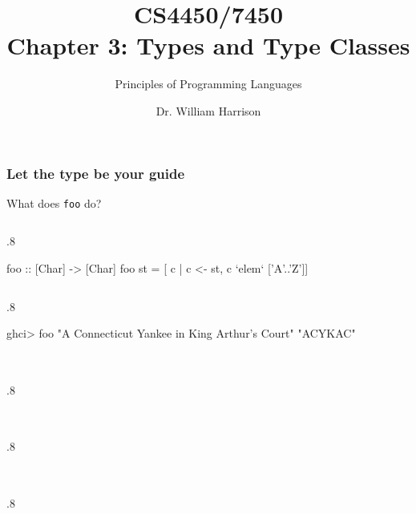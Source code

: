 \documentclass{beamer}
\title[CS4450]{CS4450/7450\\Chapter 3: Types and Type Classes}
\subtitle{Principles of Programming Languages}
\author[Bill Harrison]{Dr. William Harrison}
\institute{University of Missouri}
\newenvironment{codeblock}[1][.8]{%
\begin{columns}
\begin{column}{#1\linewidth}
\begin{exampleblock}{}}{%
\end{exampleblock}
\end{column}
\end{columns}}
\begin{document}
\frame{\titlepage}

\begin{frame}[fragile]
\frametitle{Let the type be your guide}

What does \verb+foo+ do?
\begin{codeblock}
\begin{hcode}
foo :: [Char] -> [Char]  
foo st = [ c | c <- st, c `elem` ['A'..'Z']] 
\end{hcode}
\end{codeblock}

\pause
\begin{codeblock}
\begin{hcode}
ghci> foo "A Connecticut Yankee in King Arthur's Court"
"ACYKAC"
\end{hcode}
\end{codeblock}

\end{frame}


\begin{frame}[fragile]
\frametitle{}

\begin{codeblock}
\begin{hcode}

\end{hcode}
\end{codeblock}

\end{frame}


\begin{frame}[fragile]
\frametitle{}

\begin{codeblock}
\begin{hcode}

\end{hcode}
\end{codeblock}

\end{frame}


\begin{frame}[fragile]
\frametitle{}

\begin{codeblock}
\begin{hcode}

\end{hcode}
\end{codeblock}

\end{frame}
\end{document}
